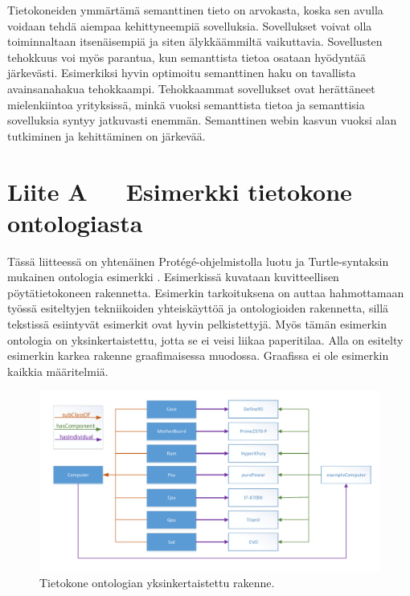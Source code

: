 \documentclass[finnish, 12pt, a4paper, elec, utf8, pdfa, online]{aaltothesis}
\begin{document}
{Tietokoneiden ymmärtämä semanttinen tieto on arvokasta, koska sen avulla voidaan tehdä aiempaa kehittyneempiä sovelluksia. Sovellukset voivat olla toiminnaltaan itsenäisempiä ja siten älykkäämmiltä vaikuttavia. Sovellusten tehokkuus voi myös parantua, kun semanttista tietoa osataan hyödyntää järkevästi. Esimerkiksi hyvin optimoitu semanttinen haku on tavallista avainsanahakua tehokkaampi. Tehokkaammat sovellukset ovat herättäneet mielenkiintoa yrityksissä, minkä vuoksi semanttista tietoa ja semanttisia sovelluksia syntyy jatkuvasti enemmän. Semanttinen webin kasvun vuoksi alan tutkiminen ja kehittäminen on järkevää.
\enlargethispage{1\baselineskip}

\clearpage

\clearpage
\thesisappendix
\section*{Liite A\ \ \ Esimerkki tietokone ontologiasta \label{Liite A}}

Tässä liitteessä on yhtenäinen Protégé-ohjelmistolla luotu ja Turtle-syntaksin mukainen ontologia esimerkki \cite{Protege}. Esimerkissä kuvataan kuvitteellisen pöytätietokoneen rakennetta. Esimerkin tarkoituksena on auttaa hahmottamaan työssä esiteltyjen tekniikoiden yhteiskäyttöä ja ontologioiden rakennetta, sillä tekstissä esiintyvät esimerkit ovat hyvin pelkistettyjä. Myös tämän esimerkin ontologia on yksinkertaistettu, jotta se ei veisi liikaa paperitilaa. Alla on esitelty esimerkin karkea rakenne graafimaisessa muodossa. Graafissa ei ole esimerkin kaikkia määritelmiä.

\begin{figure}[htb]
\centering
\includegraphics[width=15cm]{images/Computer_example.pdf}
\caption{Tietokone ontologian yksinkertaistettu rakenne. \label{images/taulukko}}
\end{figure}

\clearpage


}
\end{document}
